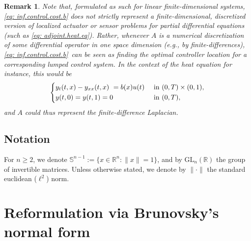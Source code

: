 \documentclass[journal,twoside,web]{ieeecolor}
\newcommand{\R}{\mathbb{R}}
\newtheorem{remark}{Remark}
\begin{document}
	\begin{remark} Note that, formulated as such for linear finite-dimensional systems, \eqref{eq: inf.control.cost.b} does not strictly represent a finite-dimensional, discretized version of localized actuator or sensor problems for partial differential equations (such as \eqref{eq: adjoint.heat.eq}). 
	Rather, whenever $A$ is a numerical discretization of some differential operator in one space dimension (e.g., by finite-differences),  \eqref{eq: inf.control.cost.b} can be seen as finding the optimal controller location for a corresponding \emph{lumped control system}. In the context of the heat equation for instance, this would be 
	\begin{equation}
	\begin{dcases}
	y_t(t,x) - y_{xx}(t,x) = b(x)u(t) &\text{ in } (0,T)\times(0,1),\\
	y(t,0) = y(t,1) = 0 &\text{ in } (0,T),
	\end{dcases}
	\end{equation}
	and $A$ could thus represent the finite-difference Laplacian.
	\end{remark}
	
	\subsection*{Notation} For $n\geqslant2$, we denote $\mathbb{S}^{n-1}:=\{x\in\R^n \colon \|x\|=1\}$, and by $\mathrm{GL}_n(\R)$ the group of invertible matrices. Unless otherwise stated, we denote by $\|\cdot\|$ the standard euclidean ($\ell^2$) norm. 
	
	\section{Reformulation via Brunovsky's normal form} \label{sec: brunovsky}
\end{document}
